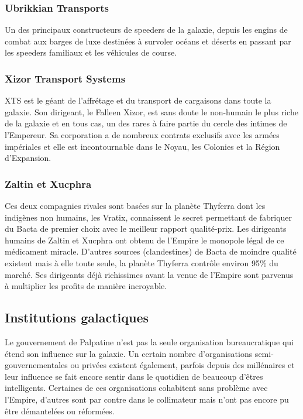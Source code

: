 \documentclass[twoside]{article}
\begin{document}
\subsubsection{Ubrikkian Transports}
Un des principaux constructeurs de speeders de la galaxie, depuis les engins de combat aux barges de luxe destinées à survoler océans et déserts en passant par les speeders familiaux et les véhicules de course.

\subsubsection{Xizor Transport Systems}
XTS est le géant de l'affrétage et du transport de cargaisons dans toute la galaxie. Son dirigeant, le Falleen Xizor, est sans doute le non-humain le plus riche de la galaxie et en tous cas, un des rares à faire partie du cercle des intimes de l'Empereur. Sa corporation a de nombreux contrats exclusifs avec les armées impériales et elle est incontournable dans le Noyau, les Colonies et la Région d'Expansion.

\subsubsection{Zaltin et Xucphra}
Ces deux compagnies rivales sont basées sur la planète Thyferra dont les indigènes non humains, les Vratix, connaissent le secret permettant de fabriquer du Bacta de premier choix avec le meilleur rapport qualité-prix. Les dirigeants humains de Zaltin et Xucphra ont obtenu de l'Empire le monopole légal de ce médicament miracle. D'autres sources (clandestines) de Bacta de moindre qualité existent mais à elle toute seule, la planète Thyferra contrôle environ 95\% du marché. Ses dirigeants déjà richissimes avant la venue de l'Empire sont parvenus à multiplier les profits de manière incroyable.

\subsection{Institutions galactiques}
Le gouvernement de Palpatine n'est pas la seule organisation bureaucratique qui étend son influence sur la galaxie. Un certain nombre d'organisations semi-gouvernementales ou privées existent également, parfois depuis des millénaires et leur influence se fait encore sentir dans le quotidien de beaucoup d'êtres intelligents. Certaines de ces organisations cohabitent sans problème avec l'Empire, d'autres sont par contre dans le collimateur mais n'ont pas encore pu être démantelées ou réformées.
\end{document}
